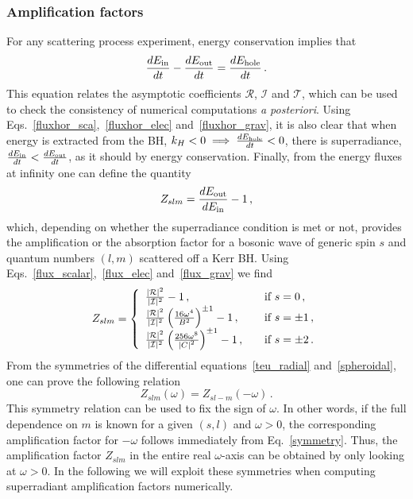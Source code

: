 \documentclass[11pt]{article}
\newcommand{\be}{\begin{equation}}
\newcommand{\ee}{\end{equation}}
\numberwithin{equation}{section} %
\begin{document}
\subsubsection{Amplification factors}\label{sec:amplcoeff}
For any scattering process experiment, energy conservation implies that
%
\be
\frac{dE_{\rm in}}{dt}-\frac{dE_{\rm out}}{dt}=\frac{dE_{\rm hole}}{dt}\,.
\ee
%
This equation relates the asymptotic coefficients $\mathcal{R}$, $\mathcal{I}$ and $\mathcal{T}$, which can be used to check the consistency of numerical computations {\it a posteriori}. Using Eqs.~\eqref{fluxhor_sca},~\eqref{fluxhor_elec} and~\eqref{fluxhor_grav}, it is also clear that when energy is extracted from the BH, $k_H<0 \implies \frac{dE_{\rm hole}}{dt}<0$, there is superradiance,$\frac{dE_{\rm in}}{dt}<\frac{dE_{\rm out}}{dt}$, as it should by energy conservation.
%
Finally, from the energy fluxes at infinity one can define the quantity
%
\be
Z_{slm}=\frac{dE_{\rm out}}{dE_{\rm in}}-1\,,
\ee
%
which, depending on whether the superradiance condition is met or not, provides the amplification or the absorption factor for a bosonic wave of generic spin $s$ and quantum numbers $(l,m)$ scattered off a Kerr BH. Using Eqs.~\eqref{flux_scalar},~\eqref{flux_elec} and~\eqref{flux_grav} we find
%
\be\label{def:sigma}
Z_{slm}=
 \left\{ 
 \begin{array}{l l}
\frac{|{\cal R}|^2}{|{\cal I}|^2}-1\,, &\quad \text{if  } s=0\,,\\
\frac{|{\cal R}|^2}{|{\cal I}|^2}\left(\frac{16\omega^4}{B^2}\right)^{\pm 1}-1\,, &\quad \text{if  } s=\pm 1\,,\\ 
\frac{|{\cal R}|^2}{|{\cal I}|^2}\left(\frac{256\omega^8}{\left|C\right|^2}\right)^{\pm 1}-1\,, &\quad \text{if  } s=\pm 2\,.
\end{array} \right.
\ee
%
From the symmetries of the differential equations~\eqref{teu_radial} and~\eqref{spheroidal}, one can prove the following relation
\begin{equation}
 Z_{slm}(\omega)=Z_{sl-m}(-\omega) \,.\label{symmetry}
\end{equation}
This symmetry relation can be used to fix the sign of $\omega$. In other words, if the full dependence on $m$ is known for a given $(s,l)$ and $\omega>0$, the corresponding amplification factor for $-\omega$ follows immediately from Eq.~\eqref{symmetry}. Thus, the amplification factor $Z_{slm}$ in the entire real $\omega$-axis can be obtained by only looking at $\omega>0$. In the following we will exploit these symmetries when computing superradiant amplification factors numerically.
\end{document}
